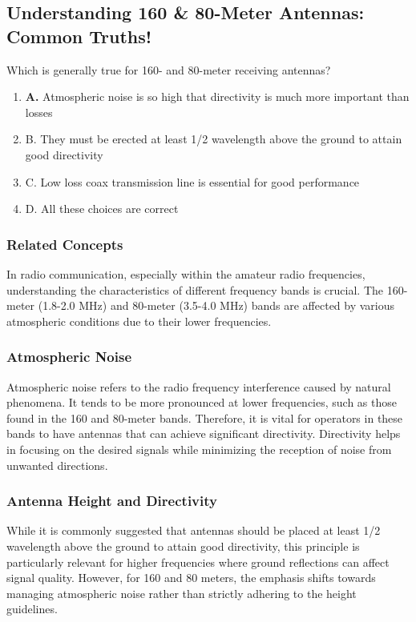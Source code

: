 \subsection{Understanding 160 \& 80-Meter Antennas: Common Truths!}

\begin{tcolorbox}[colback=gray!10, colframe=black, title=E9H02] 

Which is generally true for 160- and 80-meter receiving antennas?
\begin{enumerate}[label=\Alph*)]
    \item \textbf{A.} Atmospheric noise is so high that directivity is much more important than losses
    \item B. They must be erected at least 1/2 wavelength above the ground to attain good directivity
    \item C. Low loss coax transmission line is essential for good performance
    \item D. All these choices are correct
\end{enumerate} \end{tcolorbox}



\subsubsection{Related Concepts}

In radio communication, especially within the amateur radio frequencies, understanding the characteristics of different frequency bands is crucial. The 160-meter (1.8-2.0 MHz) and 80-meter (3.5-4.0 MHz) bands are affected by various atmospheric conditions due to their lower frequencies. 

\subsubsection{Atmospheric Noise}
Atmospheric noise refers to the radio frequency interference caused by natural phenomena. It tends to be more pronounced at lower frequencies, such as those found in the 160 and 80-meter bands. Therefore, it is vital for operators in these bands to have antennas that can achieve significant directivity. Directivity helps in focusing on the desired signals while minimizing the reception of noise from unwanted directions.

\subsubsection{Antenna Height and Directivity}
While it is commonly suggested that antennas should be placed at least 1/2 wavelength above the ground to attain good directivity, this principle is particularly relevant for higher frequencies where ground reflections can affect signal quality. However, for 160 and 80 meters, the emphasis shifts towards managing atmospheric noise rather than strictly adhering to the height guidelines.


